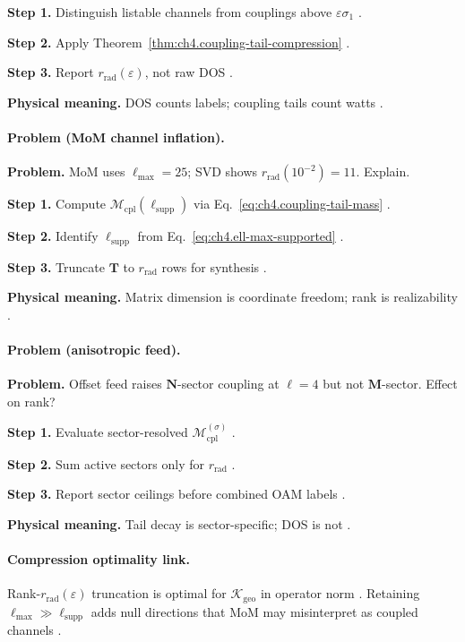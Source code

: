 \textbf{Step 1.} Distinguish listable channels from couplings above \(\varepsilon\sigma_{1}\) \cite{hansen1988,stratton1941}.

\textbf{Step 2.} Apply Theorem~\ref{thm:ch4.coupling-tail-compression} \cite{harrington2001,devaney2004}.

\textbf{Step 3.} Report \(r_{\mathrm{rad}}(\varepsilon)\), not raw DOS \cite{jackson1999}.

\textbf{Physical meaning.} DOS counts labels; coupling tails count watts \cite{hansen1988}.

\paragraph{Problem (MoM channel inflation).}
\textbf{Problem.} MoM uses \(\ell_{\max}=25\); SVD shows \(r_{\mathrm{rad}}(10^{-2})=11\). Explain.

\textbf{Step 1.} Compute \(\mathcal{M}_{\mathrm{cpl}}(\ell_{\mathrm{supp}})\) via Eq.~\eqref{eq:ch4.coupling-tail-mass} \cite{hansen1988}.

\textbf{Step 2.} Identify \(\ell_{\mathrm{supp}}\) from Eq.~\eqref{eq:ch4.ell-max-supported} \cite{harrington2001}.

\textbf{Step 3.} Truncate \(\mathbf{T}\) to \(r_{\mathrm{rad}}\) rows for synthesis \cite{devaney2004,stratton1941}.

\textbf{Physical meaning.} Matrix dimension is coordinate freedom; rank is realizability \cite{harrington2001}.

\paragraph{Problem (anisotropic feed).}
\textbf{Problem.} Offset feed raises \(\mathbf{N}\)-sector coupling at \(\ell=4\) but not \(\mathbf{M}\)-sector. Effect on rank?

\textbf{Step 1.} Evaluate sector-resolved \(\mathcal{M}_{\mathrm{cpl}}^{(\sigma)}\) \cite{harrington2001,hansen1988}.

\textbf{Step 2.} Sum active sectors only for \(r_{\mathrm{rad}}\) \cite{stratton1941}.

\textbf{Step 3.} Report sector ceilings before combined OAM labels \cite{devaney2004}.

\textbf{Physical meaning.} Tail decay is sector-specific; DOS is not \cite{hansen1988}.

\paragraph{Compression optimality link.}
Rank-\(r_{\mathrm{rad}}(\varepsilon)\) truncation is optimal for \(\boldsymbol{\mathcal{K}}_{\mathrm{geo}}\) in operator norm
\cite{harrington2001,devaney2004}. Retaining \(\ell_{\max}\gg\ell_{\mathrm{supp}}\) adds null directions that MoM may misinterpret as
coupled channels \cite{stratton1941,hansen1988}.

